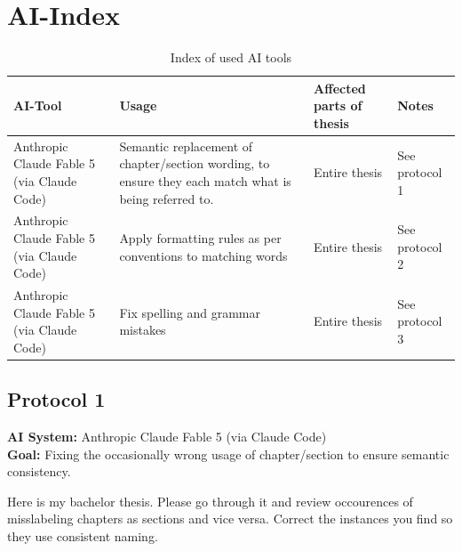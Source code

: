\chapter*{AI-Index}

\begin{table}[htbp]
	\centering
	\renewcommand{\arraystretch}{1.3}
	\begin{tabularx}{\textwidth}{@{} X
			>{\hsize=1.2\hsize\raggedright\arraybackslash}X
			>{\hsize=0.8\hsize\raggedright\arraybackslash}X
			>{\hsize=1.0\hsize\raggedright\arraybackslash}X @{}}
		\toprule
		\textbf{AI-Tool}                           & \textbf{Usage}                                                                                        & \textbf{Affected parts of thesis} & \textbf{Notes} \\
		\midrule
		Anthropic Claude Fable 5 (via Claude Code) & Semantic replacement of chapter/section wording, to ensure they each match what is being referred to. & Entire thesis                     & See protocol 1 \\
		\hline
		Anthropic Claude Fable 5 (via Claude Code) & Apply formatting rules as per conventions to matching words                                           & Entire thesis                     & See protocol 2 \\
		\hline
		Anthropic Claude Fable 5 (via Claude Code) & Fix spelling and grammar mistakes                                                                     & Entire thesis                     & See protocol 3 \\
		\bottomrule
    \end{tabularx}
	\caption{Index of used AI tools}
	\label{tab:ki_verzeichnis}
\end{table}

\section*{Protocol 1}
\textbf{AI System:} Anthropic Claude Fable 5 (via Claude Code) \\
\textbf{Goal:} Fixing the occasionally wrong usage of chapter/section to ensure semantic consistency.
\begin{tcolorbox}[colback=gray!5!white, colframe=gray!60!black, title=\textbf{Prompt}]
	Here is my bachelor thesis. Please go through it and review occourences of misslabeling chapters as sections and vice versa. Correct the instances you find so they use consistent naming.
\end{tcolorbox}

